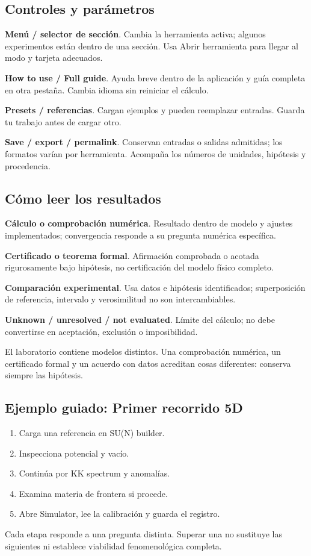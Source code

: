 \documentclass[11pt,a4paper]{article}
\begin{document}
\subsection*{Controles y parámetros}
\textbf{Menú / selector de sección}. Cambia la herramienta activa; algunos experimentos están dentro de una sección. Usa Abrir herramienta para llegar al modo y tarjeta adecuados.

\textbf{How to use / Full guide}. Ayuda breve dentro de la aplicación y guía completa en otra pestaña. Cambia idioma sin reiniciar el cálculo.

\textbf{Presets / referencias}. Cargan ejemplos y pueden reemplazar entradas. Guarda tu trabajo antes de cargar otro.

\textbf{Save / export / permalink}. Conservan entradas o salidas admitidas; los formatos varían por herramienta. Acompaña los números de unidades, hipótesis y procedencia.

\subsection*{Cómo leer los resultados}
\textbf{Cálculo o comprobación numérica}. Resultado dentro de modelo y ajustes implementados; convergencia responde a su pregunta numérica específica.

\textbf{Certificado o teorema formal}. Afirmación comprobada o acotada rigurosamente bajo hipótesis, no certificación del modelo físico completo.

\textbf{Comparación experimental}. Usa datos e hipótesis identificados; superposición de referencia, intervalo y verosimilitud no son intercambiables.

\textbf{Unknown / unresolved / not evaluated}. Límite del cálculo; no debe convertirse en aceptación, exclusión o imposibilidad.

El laboratorio contiene modelos distintos. Una comprobación numérica, un certificado formal y un acuerdo con datos acreditan cosas diferentes: conserva siempre las hipótesis.
\subsection*{Ejemplo guiado: Primer recorrido 5D}
\begin{enumerate}
\item Carga una referencia en SU(N) builder.
\item Inspecciona potencial y vacío.
\item Continúa por KK spectrum y anomalías.
\item Examina materia de frontera si procede.
\item Abre Simulator, lee la calibración y guarda el registro.
\end{enumerate}
Cada etapa responde a una pregunta distinta. Superar una no sustituye las siguientes ni establece viabilidad fenomenológica completa.
\end{document}
